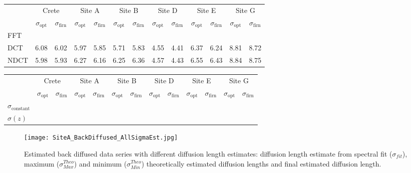 \documentclass[../../CompleteThesis2/Complete_2ndDraft]{subfiles}
\begin{document}
\begin{table}[ht]
	\centering
	\begin{tabular}{l||*{6}{c | c||}}
		&
		\multicolumn{2}{c}{Crete} & \multicolumn{2}{c}{Site A} & \multicolumn{2}{c}{Site B} & \multicolumn{2}{c}{Site D} & \multicolumn{2}{c}{Site E} & \multicolumn{2}{c||}{Site G} \\
		&
		$\sigma_{\text{opt}}$ & $\sigma_{\text{firn}}$ & $\sigma_{\text{opt}}$ & $\sigma_{\text{firn}}$ & $\sigma_{\text{opt}}$ & $\sigma_{\text{firn}}$ & $\sigma_{\text{opt}}$ & $\sigma_{\text{firn}}$ & $\sigma_{\text{opt}}$ & $\sigma_{\text{firn}}$ & $\sigma_{\text{opt}}$ & $\sigma_{\text{firn}}$ \\
		
		\hline
		FFT & & & & & & & & & & & & \\ 
		DCT & 6.08 & 6.02 & 5.97 & 5.85 & 5.71 & 5.83 & 4.55 & 4.41 & 6.37 & 6.24 & 8.81 & 8.72 \\
		NDCT & 5.98 & 5.93 & 6.27 & 6.16 & 6.25 & 6.36 & 4.57 & 4.43 & 6.55 & 6.43 & 8.84 & 8.75 \\
	\end{tabular}
\end{table}

\begin{table}[ht]
	\centering
	\begin{tabular}{l||*{6}{c | c||}}
		&
		\multicolumn{2}{c}{Crete} & \multicolumn{2}{c}{Site A} & \multicolumn{2}{c}{Site B} & \multicolumn{2}{c}{Site D} & \multicolumn{2}{c}{Site E} & \multicolumn{2}{c||}{Site G} \\
		&
		$\sigma_{\text{opt}}$ & $\sigma_{\text{firn}}$ & $\sigma_{\text{opt}}$ & $\sigma_{\text{firn}}$ & $\sigma_{\text{opt}}$ & $\sigma_{\text{firn}}$ & $\sigma_{\text{opt}}$ & $\sigma_{\text{firn}}$ & $\sigma_{\text{opt}}$ & $\sigma_{\text{firn}}$ & $\sigma_{\text{opt}}$ & $\sigma_{\text{firn}}$ \\
		
		\hline
		$\sigma_{\text{constant}}$ & & & & & & & & & & & & \\ 
		$\sigma(z)$ & & & & & & & & & & & & \\ 
	\end{tabular}
\end{table}

\begin{figure}
	\centering
	\texttt{[image: SiteA\_BackDiffused\_AllSigmaEst.jpg]}
	\caption[All diffusion length estimate deconvolutions, Site A]{Estimated back diffused data series with different diffusion length estimates: diffusion length estimate from spectral fit ($\sigma_{fit}$), maximum ($\sigma_{Max}^{Theo}$) and minimum ($\sigma_{Min}^{Theo}$) theoretically estimated diffusion lengths and final estimated diffusion length.}
	\label{fig:SiteA_BackDiffused_AllSigmaEst}
\end{figure}
\end{document}
